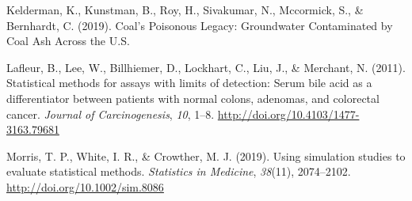 \documentclass[12pt, twoside]{amherstthesis}
\newlength{\cslhangindent}
\newenvironment{cslreferences}%
  {\setlength{\parindent}{0pt}%
  \everypar{\setlength{\hangindent}{\cslhangindent}}\ignorespaces}%
  {\par}
\begin{document}
\begin{cslreferences}
\leavevmode\hypertarget{ref-Kelderman2019}{}%
Kelderman, K., Kunstman, B., Roy, H., Sivakumar, N., Mccormick, S., \& Bernhardt, C. (2019). Coal's Poisonous Legacy: Groundwater Contaminated by Coal Ash Across the U.S.

\leavevmode\hypertarget{ref-Lafleur2011}{}%
Lafleur, B., Lee, W., Billhiemer, D., Lockhart, C., Liu, J., \& Merchant, N. (2011). Statistical methods for assays with limits of detection: Serum bile acid as a differentiator between patients with normal colons, adenomas, and colorectal cancer. \emph{Journal of Carcinogenesis}, \emph{10}, 1--8. \url{http://doi.org/10.4103/1477-3163.79681}

\leavevmode\hypertarget{ref-Morris2019}{}%
Morris, T. P., White, I. R., \& Crowther, M. J. (2019). Using simulation studies to evaluate statistical methods. \emph{Statistics in Medicine}, \emph{38}(11), 2074--2102. \url{http://doi.org/10.1002/sim.8086}
\end{cslreferences}
\end{document}
